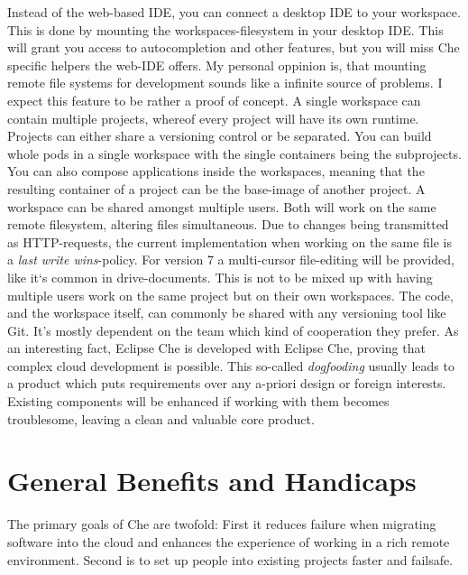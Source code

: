 \documentclass[utf8,biblatex]{lni}
\begin{document}
Instead of the web-based IDE, you can connect a desktop IDE to your workspace. 
This is done by mounting the workspaces-filesystem  in  your  desktop  IDE. 
This  will grant you access to autocompletion and other features, but you will miss Che specific helpers the web-IDE offers. 
My personal oppinion is, that mounting remote file systems for development sounds like a infinite source of problems. 
I expect this feature to be rather a proof of concept.
A single workspace can contain multiple projects, whereof every project will have its own runtime. 
Projects can either share a versioning control or be separated. 
You can build whole pods in a single workspace with the single containers being the subprojects. 
You can also compose applications inside the workspaces, meaning that the resulting 
container of a project can be the base-image of another project. 
A workspace can be shared amongst multiple users. 
Both will work on the same remote filesystem, altering files simultaneous. 
Due to changes being transmitted as HTTP-requests, the current implementation when working on the same file is a \textit{last write wins}-policy. 
For version 7 a multi-cursor file-editing will be provided, like it`s common in 
drive-documents. 
This is not to be mixed up with having multiple users work on the same project but on their own workspaces. 
The code, and the workspace itself, can commonly be shared with any versioning tool like Git.
It's mostly dependent on the team which kind of cooperation they prefer. 
As  an  interesting  fact,  Eclipse  Che  is  developed  with Eclipse Che, proving that complex cloud development is possible. 
This so-called \textit{dogfooding} usually leads to a product which puts requirements over any a-priori design or foreign interests.  
Existing components will be enhanced if working with them becomes troublesome, leaving a clean and valuable core product. 

\section{General Benefits and Handicaps}
The primary goals of Che are twofold: 
First it reduces failure when migrating software into the cloud and enhances the experience of working in a rich remote environment.
Second is to set up people into existing projects faster and failsafe.
\end{document}
